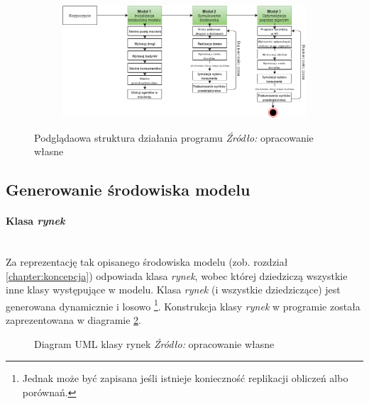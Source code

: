 \documentclass[polish, twoside, 12pt, a4paper]{article}
\theoremstyle{definition}
\theoremstyle{plain}
\theoremstyle{remark}
\begin{document}
\begin{figure}[hbt]
  \centering
  \begin{subfigure}[t]{0.95\textwidth}
    \includegraphics[width=\textwidth]{pictures/Struktura.png}
  \end{subfigure}
  \captionsetup{margin=10pt,font=small,labelfont=bf,width=.8\textwidth}
  \caption[Struktura działania programu]{Podglądaowa struktura działania programu \textit{Źródło:} opracowanie własne}\label{fig:struktura}
\end{figure}


\subsection{Generowanie środowiska modelu}
\paragraph{Klasa \textit{rynek}}\mbox{}\\
Za reprezentację tak opisanego środowiska modelu (zob. rozdział \ref{chapter:koncepcja}) odpowiada klasa \textit{rynek}, wobec której dziedziczą wszystkie inne klasy występujące w modelu. Klasa \textit{rynek} (i wszystkie dziedziczące) jest generowana dynamicznie i losowo \footnote{Jednak może być zapisana jeśli istnieje konieczność replikacji obliczeń albo porównań.}.  Konstrukcja klasy \textit{rynek} w programie została zaprezentowana w diagramie \ref{UML:rynek}. \\


\begin{figure}[hbt]
  \centering
{}
  \captionsetup{margin=10pt,font=small,labelfont=bf,width=.8\textwidth}
  \caption[Diagram UML klasy rynek]{Diagram UML klasy rynek \textit{Źródło:} opracowanie własne}\label{UML:rynek}
\end{figure}
\end{document}
